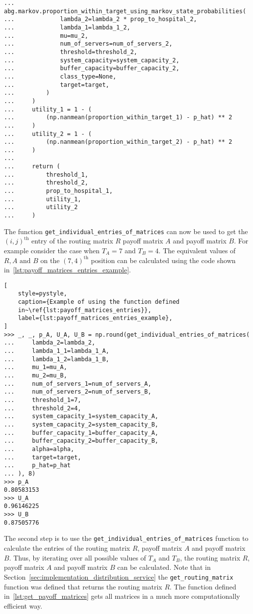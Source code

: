 \begin{lstlisting}
...         abg.markov.proportion_within_target_using_markov_state_probabilities(
...             lambda_2=lambda_2 * prop_to_hospital_2,
...             lambda_1=lambda_1_2,
...             mu=mu_2,
...             num_of_servers=num_of_servers_2,
...             threshold=threshold_2,
...             system_capacity=system_capacity_2,
...             buffer_capacity=buffer_capacity_2,
...             class_type=None,
...             target=target,
...         )
...     )
...     utility_1 = 1 - (
...         (np.nanmean(proportion_within_target_1) - p_hat) ** 2
...     )
...     utility_2 = 1 - (
...         (np.nanmean(proportion_within_target_2) - p_hat) ** 2
...     )
... 
...     return (
...         threshold_1,    
...         threshold_2,
...         prop_to_hospital_1,
...         utility_1,
...         utility_2
...     )

\end{lstlisting}

The function \texttt{get\_individual\_entries\_of\_matrices} can
now be used to get the \((i,j)^\text{th}\) entry of the routing matrix \(R\)
payoff matrix \(A\) and payoff matrix \(B\).
For example consider the case when \(T_A = 7\) and \(T_B = 4\).
The equivalent values of \(R, A \text{ and } B\) on the \((7, 4)^\text{th}\)
position can be calculated using the code shown
in~\ref{lst:payoff_matrices_entries_example}.

\begin{lstlisting}[
    style=pystyle,
    caption={Example of using the function defined
    in~\ref{lst:payoff_matrices_entries}},
    label={lst:payoff_matrices_entries_example},
]
>>> _, _, p_A, U_A, U_B = np.round(get_individual_entries_of_matrices(
...     lambda_2=lambda_2,
...     lambda_1_1=lambda_1_A,
...     lambda_1_2=lambda_1_B,
...     mu_1=mu_A,
...     mu_2=mu_B,
...     num_of_servers_1=num_of_servers_A,
...     num_of_servers_2=num_of_servers_B,
...     threshold_1=7,
...     threshold_2=4,
...     system_capacity_1=system_capacity_A,
...     system_capacity_2=system_capacity_B,
...     buffer_capacity_1=buffer_capacity_A,
...     buffer_capacity_2=buffer_capacity_B,
...     alpha=alpha,
...     target=target,
...     p_hat=p_hat
... ), 8)
>>> p_A
0.80583153
>>> U_A
0.96146225
>>> U_B
0.87505776

\end{lstlisting}

The second step is to use the
\texttt{get\_individual\_entries\_of\_matrices} function to
calculate the entries of the routing matrix \(R\), payoff matrix \(A\) and
payoff matrix \(B\).
Thus, by iterating over all possible values of \(T_A\) and \(T_B\), the
routing matrix \(R\), payoff matrix \(A\) and payoff matrix \(B\) can be
calculated.
Note that in Section~\ref{sec:implementation_distribution_service} the
\texttt{get\_routing\_matrix} function was defined that returns
the routing matrix \(R\).
The function defined in~\ref{lst:get_payoff_matrices} gets all matrices in a
much more computationally efficient way.

